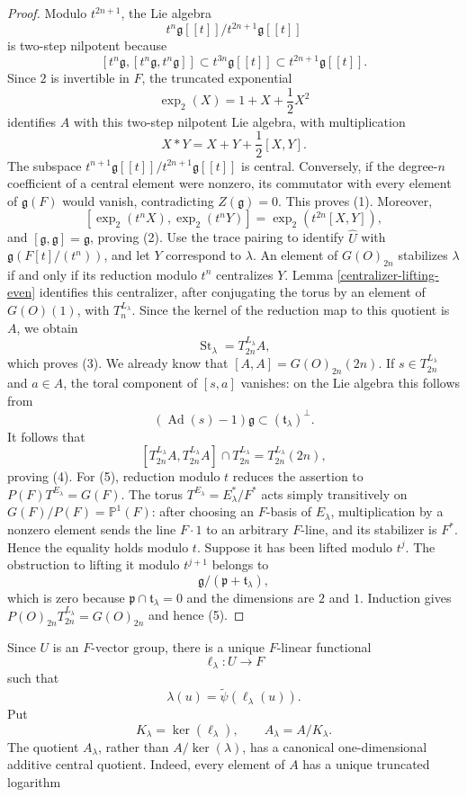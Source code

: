 \documentclass[11pt,a4paper,twoside]{amsart}
\theoremstyle{definition}
\theoremstyle{remark}
\newcommand{\tori}{\mathfrak t}
\newcommand{\bl}{\lambda}
\newcommand{\fg}{\mathfrak g}
\newcommand{\Ad}{\operatorname{Ad}}
\newcommand{\St}{\operatorname{St}}
\begin{document}
\begin{proof}
Modulo $t^{2n+1}$, the Lie algebra
$$
t^n\fg[[t]]/t^{2n+1}\fg[[t]]
$$
is two-step nilpotent because
$$
[t^n\fg,[t^n\fg,t^n\fg]]\subset t^{3n}\fg[[t]]\subset t^{2n+1}\fg[[t]].
$$
Since $2$ is invertible in $F$, the truncated exponential
$$
\exp_2(X)=1+X+\frac12X^2
$$
identifies $A$ with this two-step nilpotent Lie algebra, with multiplication
$$
X*Y=X+Y+\frac12[X,Y].
$$
The subspace $t^{n+1}\fg[[t]]/t^{2n+1}\fg[[t]]$ is central. Conversely, if the degree-$n$ coefficient of a central element were nonzero, its commutator with every element of $\fg(F)$ would vanish, contradicting $Z(\fg)=0$. This proves (1). Moreover,
$$
[\exp_2(t^nX),\exp_2(t^nY)]=\exp_2(t^{2n}[X,Y]),
$$
and $[\fg,\fg]=\fg$, proving (2).
Use the trace pairing to identify $\widehat U$ with $\fg(F[t]/(t^n))$, and let $Y$ correspond to $\bl$. An element of $G(O)_{2n}$ stabilizes $\bl$ if and only if its reduction modulo $t^n$ centralizes $Y$. Lemma \ref{centralizer-lifting-even} identifies this centralizer, after conjugating the torus by an element of $G(O)(1)$, with $T^{L_\bl}_n$. Since the kernel of the reduction map to this quotient is $A$, we obtain
$$
\St_\bl=T^{L_\bl}_{2n}A,
$$
which proves (3).
We already know that $[A,A]=G(O)_{2n}(2n)$. If $s\in T^{L_\bl}_{2n}$ and $a\in A$, the toral component of $[s,a]$ vanishes: on the Lie algebra this follows from
$$
(\Ad(s)-1)\fg\subset(\tori_\bl)^\perp.
$$
It follows that
$$
[T^{L_\bl}_{2n}A,T^{L_\bl}_{2n}A]\cap T^{L_\bl}_{2n}
=T^{L_\bl}_{2n}(2n),
$$
proving (4).
For (5), reduction modulo $t$ reduces the assertion to $P(F)T^{E_\bl}=G(F)$. The torus $T^{E_\bl}=E_\bl^*/F^*$ acts simply transitively on $G(F)/P(F)=\mathbb P^1(F)$: after choosing an $F$-basis of $E_\bl$, multiplication by a nonzero element sends the line $F\cdot1$ to an arbitrary $F$-line, and its stabilizer is $F^*$. Hence the equality holds modulo $t$. Suppose it has been lifted modulo $t^j$. The obstruction to lifting it modulo $t^{j+1}$ belongs to
$$
\fg/(\mathfrak p+\tori_\bl),
$$
which is zero because $\mathfrak p\cap\tori_\bl=0$ and the dimensions are $2$ and $1$. Induction gives $P(O)_{2n}T^{L_\bl}_{2n}=G(O)_{2n}$ and hence (5).
\end{proof}
Since $U$ is an $F$-vector group, there is a unique $F$-linear functional
$$
\ell_\bl:U\longrightarrow F
$$
such that
$$
\bl(u)=\widetilde\psi(\ell_\bl(u)).
$$
Put
$$
K_\bl=\ker(\ell_\bl),
\qquad
A_\bl=A/K_\bl.
$$
The quotient $A_\bl$, rather than $A/\ker(\bl)$, has a canonical one-dimensional additive central quotient. Indeed, every element of $A$ has a unique truncated logarithm
\end{document}
